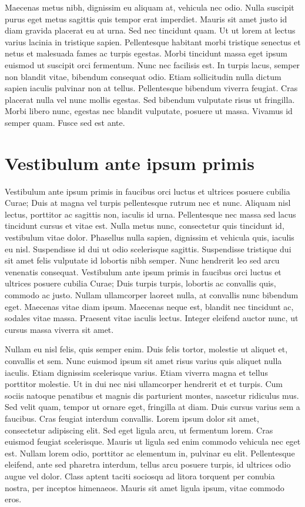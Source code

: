 \documentclass{EPUProjetDi}
\begin{document}
Maecenas metus nibh, dignissim eu aliquam at, vehicula nec odio. Nulla suscipit purus eget metus sagittis quis tempor erat imperdiet. Mauris sit amet justo id diam gravida placerat eu at urna. Sed nec tincidunt quam. Ut ut lorem at lectus varius lacinia in tristique sapien. Pellentesque habitant morbi tristique senectus et netus et malesuada fames ac turpis egestas. Morbi tincidunt massa eget ipsum euismod ut suscipit orci fermentum. Nunc nec facilisis est. In turpis lacus, semper non blandit vitae, bibendum consequat odio. Etiam sollicitudin nulla dictum sapien iaculis pulvinar non at tellus. Pellentesque bibendum viverra feugiat. Cras placerat nulla vel nunc mollis egestas. Sed bibendum vulputate risus ut fringilla. Morbi libero nunc, egestas nec blandit vulputate, posuere ut massa. Vivamus id semper quam. Fusce sed est ante.

\section{Vestibulum ante ipsum primis}

Vestibulum ante ipsum primis in faucibus orci luctus et ultrices posuere cubilia Curae; Duis at magna vel turpis pellentesque rutrum nec et nunc. Aliquam nisl lectus, porttitor ac sagittis non, iaculis id urna. Pellentesque nec massa sed lacus tincidunt cursus et vitae est. Nulla metus nunc, consectetur quis tincidunt id, vestibulum vitae dolor. Phasellus nulla sapien, dignissim et vehicula quis, iaculis eu nisl. Suspendisse id dui ut odio scelerisque sagittis. Suspendisse tristique dui sit amet felis vulputate id lobortis nibh semper. Nunc hendrerit leo sed arcu venenatis consequat. Vestibulum ante ipsum primis in faucibus orci luctus et ultrices posuere cubilia Curae; Duis turpis turpis, lobortis ac convallis quis, commodo ac justo. Nullam ullamcorper laoreet nulla, at convallis nunc bibendum eget. Maecenas vitae diam ipsum. Maecenas neque est, blandit nec tincidunt ac, sodales vitae massa. Praesent vitae iaculis lectus. Integer eleifend auctor nunc, ut cursus massa viverra sit amet.

Nullam eu nisl felis, quis semper enim. Duis felis tortor, molestie ut aliquet et, convallis et sem. Nunc euismod ipsum sit amet risus varius quis aliquet nulla iaculis. Etiam dignissim scelerisque varius. Etiam viverra magna et tellus porttitor molestie. Ut in dui nec nisi ullamcorper hendrerit et et turpis. Cum sociis natoque penatibus et magnis dis parturient montes, nascetur ridiculus mus. Sed velit quam, tempor ut ornare eget, fringilla at diam. Duis cursus varius sem a faucibus. Cras feugiat interdum convallis. Lorem ipsum dolor sit amet, consectetur adipiscing elit. Sed eget ligula arcu, ut fermentum lorem. Cras euismod feugiat scelerisque. Mauris ut ligula sed enim commodo vehicula nec eget est. Nullam lorem odio, porttitor ac elementum in, pulvinar eu elit. Pellentesque eleifend, ante sed pharetra interdum, tellus arcu posuere turpis, id ultrices odio augue vel dolor. Class aptent taciti sociosqu ad litora torquent per conubia nostra, per inceptos himenaeos. Mauris sit amet ligula ipsum, vitae commodo eros.
\end{document}
